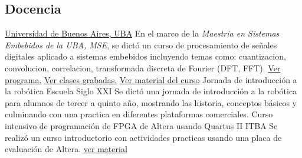 
   \subsection{\bfseries{Docencia}}
                                  {\href{\linkuba}{Universidad de Buenos Aires, UBA}} {}{}{En el marco de la \emph{Maestria en Sistemas Embebidos de la UBA, MSE}, se dictó un curso de procesamiento de señales digitales  aplicado a sistemas embebidos incluyendo temas como: cuantizacion, convolucion, correlacion, transformada discreta de Fourier (DFT, FFT). \href{\linkmse}{Ver programa.} \href{\linkmsepsfvideos}{Ver clases grabadas.} \href{\linkmsepsfmaterial}{Ver material del curso}}
       { Jornada de introducción a la robótica}                               { Escuela Siglo XXI} { } { } { Se dictó una jornada de introducción a la robótica para alumnos de tercer a quinto año, mostrando las historia, conceptos básicos y culminando con una practica en diferentes plataformas comerciales.}                     { }
       { Curso intensivo de programación de FPGA de Altera usando Quartus II} { ITBA}      { } { } { Se realizó un curso introductorio con actividades practicas usando una placa de evaluación de Altera. \href { \linkfpgasig } { ver material}}

